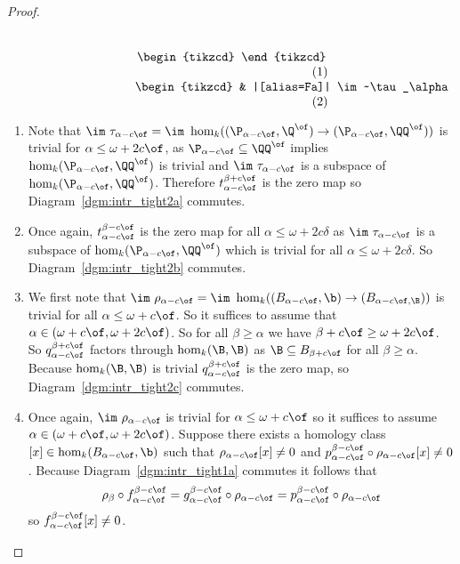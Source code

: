 \begin{proof}
\begin{scriptsize}
\begin{subequations}
\begin{minipage}{0.45\textwidth}
\begin{equation}
\begin{tikzcd}
  \end{tikzcd}\end{equation}
  \begin{equation}\label{dgm:intr_tight2d}\begin{tikzcd}
    & |[alias=Fa]|
    \im~\tau_\alpha  \arrow[to=Fb, "t_\alpha^\beta"]
    & |[alias=Fb]|
      \im~\tau_\beta\\
    \im~\rho_{\alpha-c\of}  \arrow[to=Gb, "p_{\alpha-c\of}^{\beta-c\of}"]
                      \arrow[to=Fa, "\nu_{\alpha-c\of}"]
    & |[alias=Gb]|
      \im~\rho_{\beta - c\of} \arrow[to=Fb, "\nu_{\beta-c\of}"]&
  \end{tikzcd}\end{equation}
  \end{minipage}
  \end{subequations}
  \end{scriptsize}
  \vspace{3ex}

  \begin{enumerate}[label=\Roman*.]
    \item Note that $\im~\tau_{\alpha-c\of} = \im~\hom_k((\P_{\alpha-c\of}, \Q^\of)\to (\P_{\alpha-c\of}, \QQ^\of))$ is trivial for $\alpha\leq \omega+2c\of$, as
    $\P_{\alpha-c\of}\subseteq \QQ^\of$ implies $\hom_k(\P_{\alpha-c\of}, \QQ^\of)$ is trivial and $\im~\tau_{\alpha-c\of}$ is a subspace of $\hom_k(\P_{\alpha-c\of}, \QQ^\of)$.
    Therefore $t_{\alpha-c\of}^{\beta+c\of}$ is the zero map so Diagram~\ref{dgm:intr_tight2a} commutes.
    \item Once again, $t_{\alpha-c\of}^{\beta-c\of}$ is the zero map for all $\alpha\leq\omega+2c\delta$ as $\im~\tau_{\alpha-c\of}$ is a subspace of $\hom_k(\P_{\alpha-c\of}, \QQ^\of)$ which is trivial for all $\alpha\leq\omega+2c\delta$.
    So Diagram~\ref{dgm:intr_tight2b} commutes.
    \item We first note that $\im~\rho_{\alpha-c\of} = \im~\hom_k((B_{\alpha-c\of}, \b)\to (B_{\alpha-c\of, \B}))$ is trivial for all $\alpha\leq \omega+c\of$.
    So it suffices to assume that $\alpha\in (\omega+c\of, \omega+2c\of)$.
    So for all $\beta\geq\alpha$ we have $\beta+c\of\geq\omega+2c\of$.
    So $q_{\alpha-c\of}^{\beta+c\of}$ factors through $\hom_k(\B, \B)$ as $\B\subseteq B_{\beta+c\of}$ for all $\beta\geq\alpha$.
    Because $\hom_k(\B, \B)$ is trivial $q_{\alpha-c\of}^{\beta+c\of}$ is the zero map, so Diagram~\ref{dgm:intr_tight2c} commutes.
    \item Once again, $\im~\rho_{\alpha-c\of}$ is trivial for $\alpha\leq\omega+c\of$ so it suffices to assume $\alpha\in (\omega+c\of, \omega+2c\of)$.
    Suppose there exists a homology class $[x]\in\hom_k(B_{\alpha-c\of}, \b)$ such that $\rho_{\alpha-c\of}[x]\neq 0$ and $p_{\alpha-c\of}^{\beta-c\of}\circ\rho_{\alpha-c\of}[x]\neq 0$.
    Because Diagram~\ref{dgm:intr_tight1a} commutes it follows that
    \[\rho_\beta\circ f_{\alpha-c\of}^{\beta-c\of} = g_{\alpha-c\of}^{\beta-c\of}\circ\rho_{\alpha-c\of} = p_{\alpha-c\of}^{\beta-c\of}\circ\rho_{\alpha-c\of}\]
    so $f_{\alpha - c\of}^{\beta-c\of}[x]\neq 0$.


\end{enumerate}
\end{proof}

